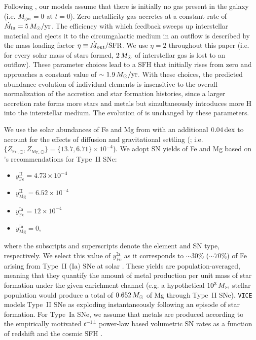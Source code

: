 Following \citet{2022arXiv220402989C}, our models assume that there is initially no gas present in the galaxy (i.e. $M_{\textrm{gas}} = 0$ at $t = 0$). Zero metallicity gas accretes at a constant rate of $\dot{M}_\text{in} = 5\,M_{\odot}/\textrm{yr}$. The efficiency with which feedback sweeps up interstellar material and ejects it to the circumgalactic medium in an outflow is described by the mass loading factor $\eta \equiv \dot{M}_\text{out} / \textrm{SFR}$. We use $\eta = 2$ throughout this paper (i.e. for every solar mass of stars formed, $2\,M_{\odot}$ of interstellar gas is lost to an outflow). These parameter choices lead to a SFH that initially rises from zero and approaches a constant value of $\sim1.9\,M_{\odot}/\textrm{yr}$. With these choices, the predicted abundance evolution of individual elements is insensitive to the overall normalization of the accretion and star formation histories, since a larger accretion rate forms more stars and metals but simultaneously introduces more H into the interstellar medium. The evolution of \MgFe{} is unchanged by these parameters.

We use the solar abundances of Fe and Mg from \citet{Magg2022} with an additional $0.04\,\textrm{dex}$ to account for the effects of diffusion and gravitational settling (\citealt{Turcotte1998}; i.e. $\{Z_{\text{Fe},\odot}, Z_{\text{Mg},\odot}\} = \{13.7, 6.71\} \times 10^{-4}$). We adopt SN yields of Fe and Mg based on \citeauthor{2024ApJ...973..122W}'s \citeyearpar{2024ApJ...973..122W} recommendations for Type~II SNe:
\begin{itemize}

	\item $y_\text{Fe}^\text{II} = 4.73 \times 10^{-4}$

	\item $y_\text{Mg}^\text{II} = 6.52 \times 10^{-4}$

	\item $y_\text{Fe}^\text{Ia} = 12 \times 10^{-4}$

	\item $y_\text{Mg}^\text{Ia} = 0$,

\end{itemize}
where the subscripts and superscripts denote the element and SN type, respectively. We select this value of $y_\text{Fe}^\text{Ia}$ as it corresponds to $\sim30\%$ ($\sim70\%$) of Fe arising from Type~II (Ia) SNe at solar \FeH{}. These yields are population-averaged, meaning that they quantify the amount of metal production per unit mass of star formation under the given enrichment channel (e.g. a hypothetical $10^3\,M_{\odot}$ stellar population would produce a total of $0.652\,M_{\odot}$ of Mg through Type~II SNe). {\tt VICE} models Type~II SNe as exploding instantaneously following an episode of star formation. For Type~Ia SNe, we assume that metals are produced according to the empirically motivated $t^{-1.1}$ power-law based volumetric SN rates as a function of redshift and the cosmic SFH \citep[e.g.][]{Maoz2012}.

